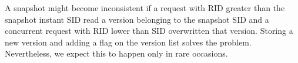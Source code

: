 A snapshot might become inconsistent if a request with \ac{RID} greater than the snapshot instant \ac{SID} read a version belonging to the snapshot \ac{SID} and a concurrent request with \ac{RID} lower than \ac{SID} overwritten that version. Storing a new version and adding a flag on the version list solves the problem. Nevertheless, we expect this to happen only in rare occasions.




